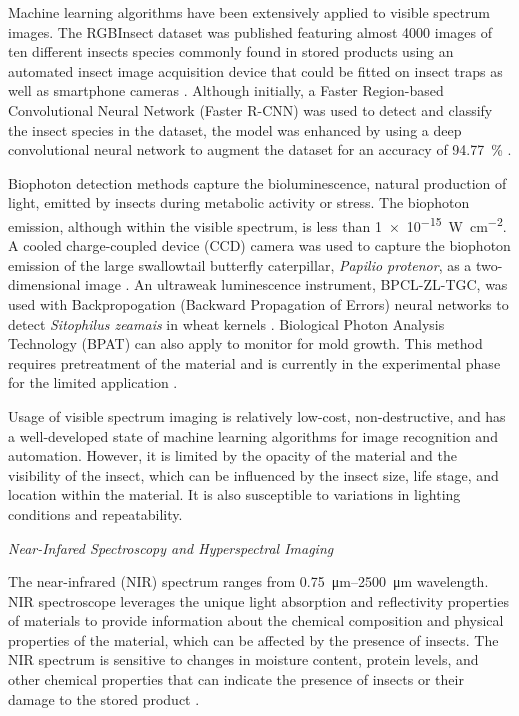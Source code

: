 \documentclass[../Vibro-Acoustic Signatures and Detection Algorithms for Stored Product Insects.tex]{subfiles}
\begin{document}
Machine learning algorithms have been extensively applied to visible spectrum images. The RGBInsect dataset was published featuring almost 4000 images of ten different insects species commonly found in stored products using an automated insect image acquisition device that could be fitted on insect traps as well as smartphone cameras \cite{liConstructionDatasetStoredgrain2019}. Although initially, a Faster Region-based Convolutional Neural Network (Faster R-CNN) was used to detect and classify the insect species in the dataset, the model was enhanced by using a deep convolutional neural network to augment the dataset for an accuracy of \SI{94.77}{\percent} \cite{liMultiscaleDetectionStoredgrain2020}.

Biophoton detection methods capture the bioluminescence, natural production of light, emitted by insects during metabolic activity or stress. The biophoton emission, although within the visible spectrum, is less than \SI{1e-15}{\watt\per\centi\meter\squared}. A cooled charge-coupled device (CCD) camera was used to capture the biophoton emission of the large swallowtail butterfly caterpillar, \textit{Papilio protenor}, as a two-dimensional image \cite{usuiNoninvasiveVisualizationPhysiological2019}. An ultraweak luminescence instrument, BPCL-ZL-TGC, was used with Backpropogation (Backward Propagation of Errors) neural networks to detect \textit{Sitophilus zeamais} in wheat kernels \cite{shiEfficientDetectionInternal2016}. Biological Photon Analysis Technology (BPAT) can also apply to monitor for mold growth. This method requires pretreatment of the material and is currently in the experimental phase for the limited application \cite{gongTechnologiesSystemsPest2026}.

Usage of visible spectrum imaging is relatively low-cost, non-destructive, and has a well-developed state of machine learning algorithms for image recognition and automation. However, it is limited by the opacity of the material and the visibility of the insect, which can be influenced by the insect size, life stage, and location within the material. It is also susceptible to variations in lighting conditions and repeatability.

\newpage
\textit{Near-Infared Spectroscopy and Hyperspectral Imaging}

The near-infrared (NIR) spectrum ranges from \SIrange{0.75}{2500}{\micro\meter} wavelength. NIR spectroscope leverages the unique light absorption and reflectivity properties of materials to provide information about the chemical composition and physical properties of the material, which can be affected by the presence of insects. The NIR spectrum is sensitive to changes in moisture content, protein levels, and other chemical properties that can indicate the presence of insects or their damage to the stored product \cite{neethirajanDetectionTechniquesStoredProduct2007, elizabethb.maghirangDetectingSingleWheat2002, keszthelyiNonDestructiveImagingSpectroscopic2020}.
\end{document}
